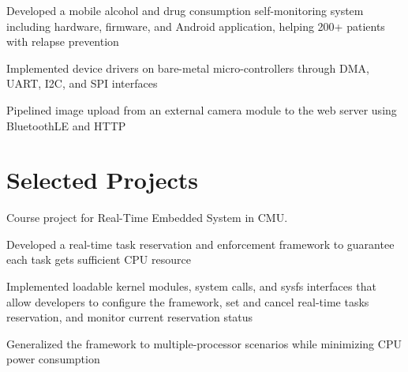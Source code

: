 \documentclass[hidelinks,letterpaper]{deedy-resume} %
\begin{document}
\begin{minipage}[t]{0.645\textwidth}
\sectionspace


\begin{tightitemize}
\item Developed a mobile alcohol and drug consumption self-monitoring system including hardware, firmware, and Android application, helping 200+ patients with relapse prevention
\item Implemented device drivers on bare-metal micro-controllers through DMA, UART, I2C, and SPI interfaces
\item Pipelined image upload from an external camera module to the web server using BluetoothLE and HTTP
\end{tightitemize}

\sectionspace

\section{Selected Projects}

\descript{}
Course project for Real-Time Embedded System in CMU. \\
\begin{tightitemize}
\item Developed a real-time task reservation and enforcement framework to guarantee each task gets sufficient CPU resource
\item Implemented loadable kernel modules, system calls, and sysfs interfaces that allow developers to configure the framework, set and cancel real-time tasks reservation, and monitor current reservation status
\item Generalized the framework to multiple-processor scenarios while minimizing CPU power consumption
\end{tightitemize}



\end{minipage}
\end{document}
